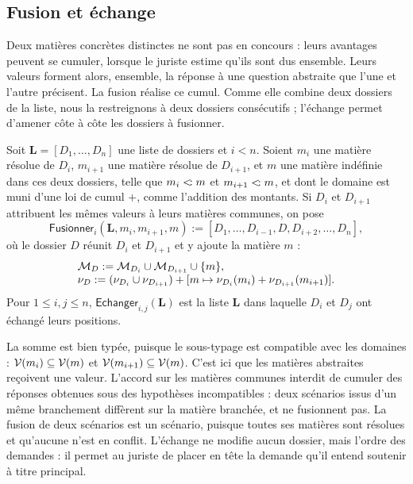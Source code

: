 \documentclass[review]{jflart}
\newcommand{\Fusionner}{\ensuremath{\mathsf{Fusionner}}}
\newcommand{\Echanger}{\ensuremath{\mathsf{Echanger}}}
\newcommand{\Liste}{\ensuremath{\mathbf L}}
\begin{document}
\subsection{Fusion et échange}\label{sec:fusion}

Deux matières concrètes distinctes ne sont pas en concours : leurs avantages
peuvent se cumuler, lorsque le juriste estime qu'ils sont dus ensemble. Leurs
valeurs forment alors, ensemble, la réponse à une question abstraite que l'une
et l'autre précisent. La fusion réalise ce cumul. Comme elle combine deux
dossiers de la liste, nous la restreignons à deux dossiers consécutifs ;
l'échange permet d'amener côte à côte les dossiers à fusionner.

\begin{defi}\label{def:fusion}
Soit \(\Liste=[D_1,\ldots,D_n]\) une liste de dossiers et \(i<n\). Soient
\(m_i\) une matière résolue de \(D_i\), \(m_{i+1}\) une matière résolue de
\(D_{i+1}\), et \(m\) une matière indéfinie dans ces deux dossiers, telle que
\(m_i\mathrel{<\!:} m\) et \(m_{i+1}\mathrel{<\!:} m\), et dont le domaine est muni d'une
loi de cumul \(+\), comme l'addition des montants. Si \(D_i\) et \(D_{i+1}\)
attribuent les mêmes valeurs à leurs matières communes, on pose
\[
\Fusionner_i(\Liste,m_i,m_{i+1},m):=[D_1,\ldots,D_{i-1},D,D_{i+2},\ldots,D_n],
\]
où le dossier \(D\) réunit \(D_i\) et \(D_{i+1}\) et y ajoute la matière
\(m\) :
\[
\begin{array}{l}
\mathcal{M}_D:=\mathcal{M}_{D_i}\cup\mathcal{M}_{D_{i+1}}\cup\{m\},\\
\nu_D:=(\nu_{D_i}\cup\nu_{D_{i+1}})+[m\mapsto\nu_{D_i}(m_i)+\nu_{D_{i+1}}(m_{i+1})].
\end{array}
\]
Pour \(1\leq i,j\leq n\), \(\Echanger_{i,j}(\Liste)\) est la liste \(\Liste\)
dans laquelle \(D_i\) et \(D_j\) ont échangé leurs positions.
\end{defi}

La somme est bien typée, puisque le sous-typage est compatible avec les
domaines : \(\mathcal{V}(m_i)\subseteq\mathcal{V}(m)\) et \(\mathcal{V}(m_{i+1})\subseteq\mathcal{V}(m)\).
C'est ici que les matières abstraites reçoivent une valeur. L'accord sur les
matières communes interdit de cumuler des réponses obtenues sous des hypothèses
incompatibles : deux scénarios issus d'un même branchement diffèrent sur la
matière branchée, et ne fusionnent pas. La fusion de deux scénarios est un
scénario, puisque toutes ses matières sont résolues et qu'aucune n'est en
conflit. L'échange ne modifie aucun dossier, mais l'ordre des demandes : il
permet au juriste de placer en tête la demande qu'il entend soutenir à titre
principal.
\end{document}
